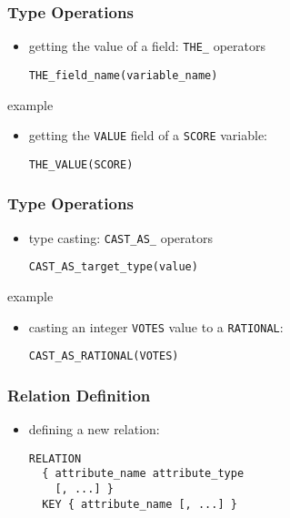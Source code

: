 \documentclass[dvipsnames]{beamer}
\theoremstyle{plain}
\begin{document}
\begin{frame}[fragile]
  \frametitle{Type Operations}

  \begin{itemize}
    \item getting the value of a field: \lstinline!THE_! operators
    \begin{lstlisting}
THE_field_name(variable_name)
    \end{lstlisting}
  \end{itemize}

  \medskip
  \begin{exampleblock}{example}
    \begin{itemize}
      \item getting the \texttt{VALUE} field of a \texttt{SCORE} variable:
      \begin{lstlisting}
THE_VALUE(SCORE)
      \end{lstlisting}
    \end{itemize}
  \end{exampleblock}
\end{frame}

\begin{frame}[fragile]
  \frametitle{Type Operations}

  \begin{itemize}
    \item type casting: \lstinline!CAST_AS_! operators
    \begin{lstlisting}
CAST_AS_target_type(value)
    \end{lstlisting}
  \end{itemize}

  \medskip
  \begin{exampleblock}{example}
    \begin{itemize}
      \item casting an integer \texttt{VOTES} value to a \texttt{RATIONAL}:
      \begin{lstlisting}
CAST_AS_RATIONAL(VOTES)
      \end{lstlisting}
    \end{itemize}
  \end{exampleblock}
\end{frame}

\begin{frame}[fragile]
  \frametitle{Relation Definition}

  \begin{itemize}
    \item defining a new relation:
    \begin{lstlisting}
RELATION
  { attribute_name attribute_type
    [, ...] }
  KEY { attribute_name [, ...] }
    \end{lstlisting}
  \end{itemize}
\end{frame}
\end{document}
